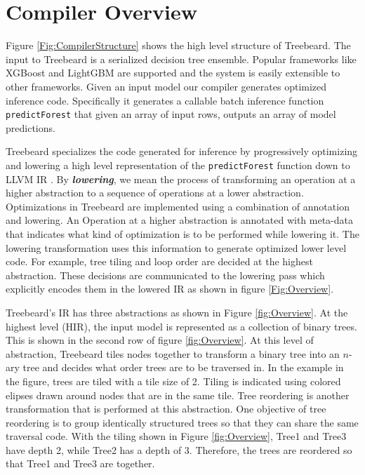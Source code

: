 \section{Compiler Overview}
Figure \ref{Fig:CompilerStructure} shows the high level structure of Treebeard. 
The input to Treebeard is a serialized decision tree ensemble. Popular frameworks 
like XGBoost and LightGBM are supported and the system is easily extensible to other frameworks.
Given an input model our compiler generates optimized inference code. Specifically it generates a 
callable batch inference function \texttt{predictForest} that given an array of input rows, outputs an
array of model predictions. 
 
Treebeard specializes the code generated for inference by progressively optimizing and lowering a 
high level representation of the \texttt{predictForest} function down to LLVM IR \cite{LLVM}.
By \textbf{\emph{lowering}}, we mean the process of transforming an operation at a higher 
abstraction to a sequence of operations at a lower abstraction. Optimizations in Treebeard 
are implemented using a combination of annotation and lowering. An Operation at a higher 
abstraction is annotated with meta-data that indicates what kind of optimization is 
to be performed while lowering it. The lowering transformation uses this information to generate 
optimized lower level code. For example, tree tiling and loop order are decided 
at the highest abstraction. These decisions are communicated to the lowering pass 
which explicitly encodes them in the lowered IR as shown in figure \ref{Fig:Overview}.

Treebeard's IR has three abstractions as shown in Figure \ref{fig:Overview}.  
At the highest level (HIR), the input model is represented as a collection of binary trees. This is shown 
in the second row of figure \ref{fig:Overview}. At this level of abstraction,
Treebeard tiles nodes together to transform a binary tree into an $n$-ary tree 
and decides what order trees are to be traversed in. In the example in the figure, 
trees are tiled with a tile size of 2. Tiling is indicated using colored elipses drawn 
around nodes that are in the same tile. Tree reordering is another transformation that is performed at this abstraction. 
One objective of tree reordering is to group identically structured trees so that they can share the same traversal code. 
With the tiling shown in Figure \ref{fig:Overview}, Tree1 and Tree3 have depth 2, while Tree2 has a depth of 3.
Therefore, the trees are reordered so that Tree1 and Tree3 are together. 

